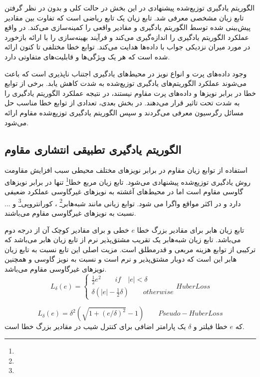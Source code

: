 \begin{latin}
	
\end{latin}

الگوریتم یادگیری توزیع‌شده پیشنهادی در این بخش در حالت کلی و بدون در نظر گرفتن تابع زیان مشخصی معرفی شد. تابع زیان یک تابع ریاضی است که تفاوت بین مقادیر پیش‌بینی شده توسط الگوریتم یادگیری و مقادیر واقعی را کمینه‌سازی می‌کند. در واقع عملکرد الگوریتم یادگیری را اندازه‌گیری می‌کند و فرآیند بهینه‌سازی را با ارائه بازخورد در مورد میران نزدیکی جواب با داده‌ها هدایت می‌کند. توابع خطا مختلفی تا کنون ارائه شده است که هر یک ویژگی‌ها و قابلیت‌های متفاوتی دارد. 

وجود داده‌های پرت و انواع نویز در محیط‌های یادگیری اجتناب ناپذیری است که باعث می‌شوند عملکرد الگوریتم‌های یادگیری توزیع‌شده به شدت کاهش یابد. برخی از توابع خطا در برابر نویزها و داده‌‌های پرت مقاوم نیستند، در نتیجه عملکرد الگوریتم یادگیری را به شدت تحت تاثیر قرار می‌دهند. در بخش بعدی، تعدادی از توابع خطا مناسب حل مسائل رگرسیون معرفی می‌گردند و سپس الگوریتم یادگیری توزیع‌شده مقاوم ارائه می‌شود. 	
\subsection{الگوریتم یادگیری تطبیقی انتشاری مقاوم}
استفاده از توابع زیان مقاوم در برابر نویزهای مختلف محیطی سبب افزایش مقاومت روش یادگیری توزیع‌شده پیشنهادی می‌شود. تابع زیان مربع خطا\footnote{}  تنها در برابر نویزهای گاوسی مقاوم است اما در محیط‌های آغشته به نویزهای غیرگاوسی عملکرد ضعیفی دارد و در اکثر مواقع واگرا می شود. توابع زیانی مانند شبه‌هابر\footnote{} ، کورانتروپی\footnote{}  و ... نسبت به نویزهای غیرگاوسی مقاوم می‌باشند. 

تابع زیان ‌هابر برای مقادیر بزرگ خطا $e$ خطی و برای مقادیر کوچک آن از درجه دوم می‌باشد. تابع زیان شبه‌هابر یک تقریب مشتق‌پذیر نرم از تابع زیان هابر می‌باشد که ترکیبی از توابع هزینه مربعی و قدرمطلق است. مزیت اصلی این تابع نسبت به تابع زیان هابر این است که دوبار مشتق‌پذیر و نرم است و نسبت به نویز گاوسی و همچنین نویزهای غیرگاوسی مقاوم می‌باشد.
\begin{equation}
	L_{\delta}(e)=
	\begin{cases}
		\frac{1}{2}e^2\qquad if \quad |e|<\delta\\
		\delta(|e|-\frac{1}{2}\delta)\qquad otherwise
	\end{cases}
	Huber Loss
\end{equation}

\begin{equation}
	L_{\delta}(e)=\delta^2(\sqrt{1+(e/\delta)^2}-1)\qquad Pseudo-Huber Loss
\end{equation}
که $e$ خطا فیلتر و $\delta$ یک پارامتر اضافی برای کنترل شیب در مقادیر بزرگ خطا است. 

